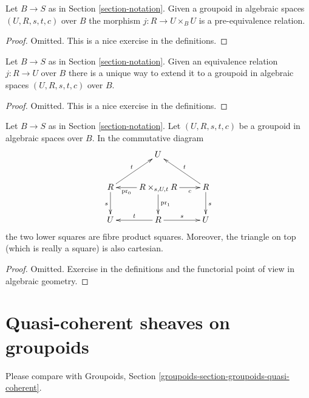 \begin{lemma}
\label{lemma-groupoid-pre-equivalence}
Let $B \to S$ as in Section \ref{section-notation}.
Given a groupoid in algebraic spaces $(U, R, s, t, c)$ over $B$
the morphism $j : R \to U\times_B U$ is a pre-equivalence
relation.
\end{lemma}

\begin{proof}
Omitted.
This is a nice exercise in the definitions.
\end{proof}

\begin{lemma}
\label{lemma-equivalence-groupoid}
Let $B \to S$ as in Section \ref{section-notation}.
Given an equivalence relation $j : R \to U$ over $B$
there is a unique way to extend it to a groupoid in algebraic spaces
$(U, R, s, t, c)$ over $B$.
\end{lemma}

\begin{proof}
Omitted.
This is a nice exercise in the definitions.
\end{proof}

\begin{lemma}
\label{lemma-diagram}
Let $B \to S$ as in Section \ref{section-notation}.
Let $(U, R, s, t, c)$ be a groupoid in algebraic spaces over $B$.
In the commutative diagram
$$
\xymatrix{
& U & \\
R \ar[d]_s \ar[ru]^t &
R \times_{s, U, t} R
\ar[l]^-{\text{pr}_0} \ar[d]^{\text{pr}_1} \ar[r]_-c &
R \ar[d]^s \ar[lu]_t \\
U & R \ar[l]_t \ar[r]^s & U
}
$$
the two lower squares are fibre product squares.
Moreover, the triangle on top (which is really a square)
is also cartesian.
\end{lemma}

\begin{proof}
Omitted.
Exercise in the definitions and the functorial point of
view in algebraic geometry.
\end{proof}







\section{Quasi-coherent sheaves on groupoids}
\label{section-groupoids-quasi-coherent}

\noindent
Please compare with
Groupoids, Section \ref{groupoids-section-groupoids-quasi-coherent}.

